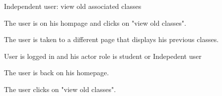 
\begin{uc}{Independent user: view old associated classes}

    \begin{uc-mss}
    \item The user is on his hompage and clicks on "view old classes".
    \item The user is taken to a different page that displays his previous classes.
    \end{uc-mss}

    \begin{uc-pre}
    \item User is logged in and his actor role is student or Indepedent user
    \end{uc-pre}

    \begin{uc-post}
    \item The user is back on his homepage. 
    \end{uc-post}

    \begin{uc-trig}
        The user clicks on "view old classes".
    \end{uc-trig}

\end{uc}

